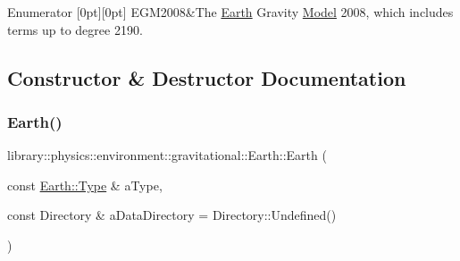 \begin{DoxyEnumFields}{Enumerator}
[0pt][0pt]{}\mbox{\label{classlibrary_1_1physics_1_1environment_1_1gravitational_1_1_earth_ab20a2b260831c66ac10f7b9a307d25caaf22fbbe07f6feeaa3d6446dabcd8b164}} 
E\+G\+M2008&The \hyperlink{classlibrary_1_1physics_1_1environment_1_1gravitational_1_1_earth}{Earth} Gravity \hyperlink{classlibrary_1_1physics_1_1environment_1_1gravitational_1_1_model}{Model} 2008, which includes terms up to degree 2190. \\
\hline

\end{DoxyEnumFields}


\subsection{Constructor \& Destructor Documentation}
\mbox{\label{classlibrary_1_1physics_1_1environment_1_1gravitational_1_1_earth_a11a143d30e7ced44b805bd55c70b1299}} 
\subsubsection{\texorpdfstring{Earth()}{Earth()}\hspace{0.1cm}{\footnotesize\ttfamily [1/2]}}
{\footnotesize\ttfamily library\+::physics\+::environment\+::gravitational\+::\+Earth\+::\+Earth (\begin{DoxyParamCaption}\item[{const \hyperlink{classlibrary_1_1physics_1_1environment_1_1gravitational_1_1_earth_ab20a2b260831c66ac10f7b9a307d25ca}{Earth\+::\+Type} \&}]{a\+Type,  }\item[{const Directory \&}]{a\+Data\+Directory = {\ttfamily Directory\+:\+:Undefined()} }\end{DoxyParamCaption})}



